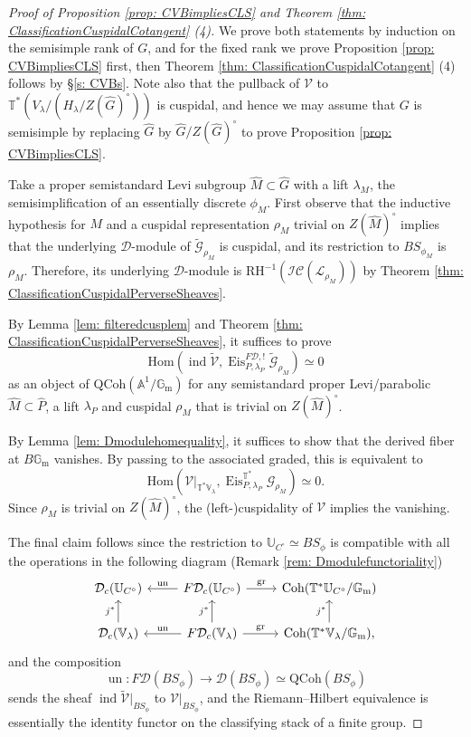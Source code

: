 \documentclass{amsart}
\theoremstyle{definition}
\theoremstyle{remark}
\numberwithin{equation}{section}
\DeclareMathOperator{\ind}{\mathrm{ind}}
\newcommand{\U}{\mathbb{U}}
\newcommand{\mc}{\mathcal}
\newcommand{\bb}{\mathbb}
\newcommand{\RH}{\mathrm{RH}}
\newcommand{\Gm}{{\mathbb{G}_{\mathrm{m}}}}
\newcommand{\Hom}{\mathrm{Hom}}
\newcommand{\wh}{\widehat}
\newcommand{\QCoh}{\mathrm{QCoh}}
\DeclareMathOperator{\Eis}{\mathrm{Eis}}
\newcommand{\Coh}{\mathrm{Coh}}
\newcommand{\V}{\mathbb{V}}
\newcommand{\T}{\mathbb{T}}
\DeclareMathOperator{\un}{\mathrm{un}}
\DeclareMathOperator{\gr}{gr}
\begin{document}
\begin{proof}[Proof of Proposition \ref{prop: CVBimpliesCLS} and Theorem \ref{thm: ClassificationCuspidalCotangent} (4)]
We prove both statements by induction on the semisimple rank of $G$, and for the fixed rank we prove Proposition \ref{prop: CVBimpliesCLS} first, then Theorem \ref{thm: ClassificationCuspidalCotangent} (4) follows by \S \ref{s: CVBs}. 
Note also that the pullback of $\mc V$ to $\T^* (V_\lambda / (H_\lambda/ Z(\wh G)^{\circ}))$ is cuspidal, and hence we may assume that $G$ is semisimple by replacing $\wh G$ by $\wh G/ Z(\wh G)^\circ$ to prove Proposition \ref{prop: CVBimpliesCLS}. 

Take a proper semistandard Levi subgroup $\wh M\subset \wh G$ with a lift $\lambda_M$, the semisimplification of an essentially discrete $\phi_M$. First observe that the inductive hypothesis for $M$ and a cuspidal representation $\rho_{M}$ trivial on $Z(\wh M)^\circ$ implies that the underlying $\mc D$-module of $\widetilde{\mc G}_{\rho_M}$ is cuspidal, and its restriction to $BS_{\phi_M}$ is $\rho_M$. Therefore, its underlying $\mc D$-module is $\RH^{-1}(\mc{IC}(\mc L_{\rho_M}))$ by Theorem \ref{thm: ClassificationCuspidalPerverseSheaves}. 

By Lemma \ref{lem: filteredcusplem} and Theorem \ref{thm: ClassificationCuspidalPerverseSheaves}, it suffices to prove
\[
\Hom (\ind \widetilde{\mc V}, \Eis_{P,\lambda_P}^{F\mc D, !} \widetilde{\mc G}_{\rho_M})\simeq 0
\]
as an object of $\QCoh (\bb A^1 /\Gm)$ for any semistandard proper Levi/parabolic $\wh M\subset \wh P$, a lift $\lambda_P$ and cuspidal $\rho_M$ that is trivial on $Z(\wh M)^{\circ}$.

By Lemma \ref{lem: Dmodulehomequality}, it suffices to show that the derived fiber at $B\Gm$ vanishes. By passing to the associated graded, this is equivalent to
\[
\Hom (\mc V|_{\T^* \V_\lambda}, \Eis_{P,\lambda_P}^{\T^{\ast}} \mc G_{\rho_M}) \simeq 0. 
\]
Since $\rho_M$ is trivial on $Z(\wh M)^{\circ}$, the (left-)cuspidality of $\mc V$ implies the vanishing. 

The final claim follows since the restriction to $\U_{C^{\circ}}\simeq BS_\phi$ is compatible with all the operations in the following diagram (Remark \ref{rem: Dmodulefunctoriality})
\begin{equation*}
    \begin{tikzcd}
        \mc{D}_c(\U_{C^{\circ}})  & F\mc{D}_c(\U_{C^{\circ}}) \arrow[l, swap, "{\un}"] \arrow[r, "{\gr}"]   & \Coh(\T^{\ast}\U_{C^{\circ}}/\Gm)  \\ 
           \mc{D}_c(\V_\lambda) \arrow[u, "j^{\ast}"] & F\mc{D}_c(\V_\lambda) \arrow[l, swap, "{\un}"] \arrow[r, "{\gr}"] \arrow[u, "j^{\ast}"] & \Coh(\T^{\ast}\V_\lambda/\Gm), \arrow[u, "j^{\ast}"]
    \end{tikzcd}
\end{equation*}
and the composition
\[
\un \colon F \mc D(BS_\phi)\to \mc D(BS_\phi)\simeq \QCoh(BS_\phi)
\]
sends the sheaf $\ind \widetilde{\mc V}|_{BS_\phi}$ to $\mc V|_{BS_\phi}$, and the Riemann--Hilbert equivalence is essentially the identity functor on the classifying stack of a finite group. 
\end{proof}
\end{document}
